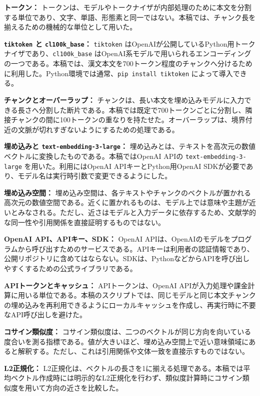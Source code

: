 \documentclass[uplatex,dvipdfmx,11pt,a4paper]{jsarticle}
\begin{document}
\noindent\textbf{トークン：} トークンは、モデルやトークナイザが内部処理のために本文を分割する単位であり、文字、単語、形態素と同一ではない。本稿では、チャンク長を揃えるための機械的な単位として用いた。

\noindent\textbf{\texttt{tiktoken} と \texttt{cl100k\_base}：} \texttt{tiktoken} はOpenAIが公開しているPython用トークナイザであり、\texttt{cl100k\_base} はOpenAI系モデルで用いられるエンコーディングの一つである\cite{openai-tiktoken}。本稿では、漢文本文を700トークン程度のチャンクへ分けるために利用した。Python環境では通常、\texttt{pip install tiktoken} によって導入できる。

\noindent\textbf{チャンクとオーバーラップ：} チャンクは、長い本文を埋め込みモデルに入力できる長さへ分割した断片である。本稿では既定で700トークンごとに分割し、隣接チャンクの間に100トークンの重なりを持たせた。オーバーラップは、境界付近の文脈が切れすぎないようにするための処理である。

\noindent\textbf{埋め込みと \texttt{text-embedding-3-large}：} 埋め込みとは、テキストを高次元の数値ベクトルに変換したものである。本稿ではOpenAI APIの \texttt{text-embedding-3-large} を用いた\cite{openai-embeddings}。利用にはOpenAI APIキーとPython用OpenAI SDKが必要であり、モデル名は実行時引数で変更できるようにした。

\noindent\textbf{埋め込み空間：} 埋め込み空間は、各テキストやチャンクのベクトルが置かれる高次元の数値空間である。近くに置かれるものは、モデル上では意味や主題が近いとみなされる。ただし、近さはモデルと入力データに依存するため、文献学的な同一性や引用関係を直接証明するものではない。

\noindent\textbf{OpenAI API、APIキー、SDK：} OpenAI APIは、OpenAIのモデルをプログラムから呼び出すためのサービスである。APIキーは利用者の認証情報であり、公開リポジトリに含めてはならない。SDKは、PythonなどからAPIを呼び出しやすくするための公式ライブラリである。

\noindent\textbf{APIトークンとキャッシュ：} APIトークンは、OpenAI APIが入力処理や課金計算に用いる単位である。本稿のスクリプトでは、同じモデルと同じ本文チャンクの埋め込みを再利用できるようにローカルキャッシュを作成し、再実行時に不要なAPI呼び出しを避けた。

\noindent\textbf{コサイン類似度：} コサイン類似度は、二つのベクトルが同じ方向を向いている度合いを測る指標である。値が大きいほど、埋め込み空間上で近い意味領域にあると解釈する。ただし、これは引用関係や文体一致を直接示すものではない。

\noindent\textbf{L2正規化：} L2正規化は、ベクトルの長さを1に揃える処理である。本稿では平均ベクトル作成時には明示的なL2正規化を行わず、類似度計算時にコサイン類似度を用いて方向の近さを比較した。
\end{document}
